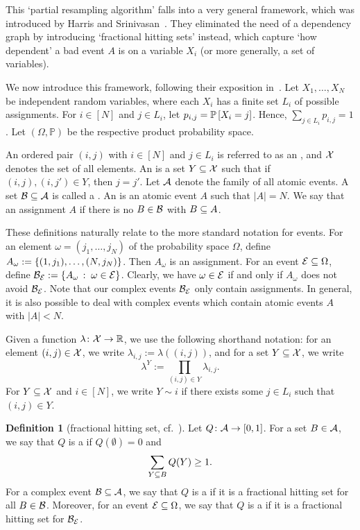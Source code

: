 \documentclass[10pt]{amsart}
\theoremstyle{definition}
\newtheorem{defin}[algorithm]{Definition}
\theoremstyle{claimstyle}
\theoremstyle{stepstyle}
\numberwithin{equation}{section}
\begin{document}
This `partial resampling algorithm' falls into a very general framework, which was introduced by Harris and Srinivasan~\cite{HS:13b,HS:13a,HS:18}. They eliminated the need of a dependency graph by introducing `fractional hitting sets' instead, which capture `how dependent' a bad event $A$ is on a variable $X_i$ (or more generally, a set of variables).

We now introduce this framework, following their exposition in~\cite{HS:18}.
Let $X_1,\dots,X_N$ be independent random variables, where each $X_i$ has a finite set $L_i$ of possible assignments. For $i\in [N]$ and $j\in L_i$, let $p_{i,j}=\mathrm{\mathbb{P}}\left[X_i=j\right]$. Hence, $\sum_{j\in L_i}p_{i,j}=1$. Let $(\Omega,\mathbb{P})$ be the respective product probability space.

An ordered pair $(i,j)$ with $i\in [N]$ and $j\in L_i$ is referred to as an , and $\mathcal{X}$ denotes the set of all elements.
An  is a set $Y\subseteq \mathcal{X}$ such that if $(i,j),(i,j')\in Y$, then $j=j'$. Let $\mathcal{A}$ denote the family of all atomic events.
A set $\mathcal{B}\subseteq \mathcal{A}$ is called a .
An  is an atomic event $A$ such that $|A|=N$.
We say that an assignment $A$  if there is no $B\in \mathcal{B}$ with $B\subseteq A$.

These definitions naturally relate to the more standard notation for events. For an element $\omega=(j_1,\dots,j_N)$ of the probability space $\Omega$, define $A_{\omega}:=\{(1,j_1),\dots,(N,j_N)\}$. Then $A_{\omega}$ is an assignment. For an event $\mathcal{E}\subseteq \Omega$, define $\mathcal{B}_{\mathcal{E}}:=\{A_{\omega}\,:\;\omega \in \mathcal{E}\}$. Clearly, we have $\omega\in \mathcal{E}$ if and only if $A_\omega$ does not avoid $\mathcal{B}_{\mathcal{E}}$. Note that our complex events $\mathcal{B}_{\mathcal{E}}$ only contain assignments. In general, it is also possible to deal with complex events which contain atomic events $A$ with $|A|<N$. 

Given a function $\lambda\colon \mathcal{X} \to \mathbb{R}$, we use the following shorthand notation: for an element $(i,j)\in \mathcal{X}$, we write $\lambda_{i,j}:=\lambda((i,j))$, and for a set $Y\subseteq \mathcal{X}$, we write $$\lambda^Y:=\prod_{(i,j)\in Y}\lambda_{i,j}.$$
For $Y\subseteq \mathcal{X}$ and $i\in [N]$, we write $Y\sim i$ if there exists some $j\in L_i$ such that $(i,j)\in Y$.






\begin{defin}[fractional hitting set, cf.~{\cite[{Definition~2.1}]{HS:18}}]
Let $Q\colon \mathcal{A} \to [0,1]$. For a set $B\in \mathcal{A}$, we say that $Q$ is a  if $Q(\emptyset)=0$ and $$\sum_{Y\subseteq B}Q(Y)\ge 1.$$ For a complex event $\mathcal{B}\subseteq \mathcal{A}$, we say that $Q$ is a  if it is a fractional hitting set for all $B\in \mathcal{B}$. Moreover, for an event $\mathcal{E}\subseteq \Omega$, we say that $Q$ is a  if it is a fractional hitting set for $\mathcal{B}_{\mathcal{E}}$.
\end{defin}
\end{document}
